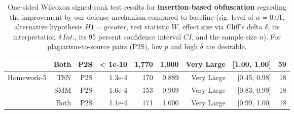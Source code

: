 \begin{table}[h]
\begin{tabular}{lrrrrrrrr}
		                                & Both    & P2S   & < 1e-10 & 1,770 & 1.000    & Very Large     & [1.00, 1.00]     & 59 \\  
		\hline
		\multirow{3}{*}{{Homework-5}}   & TSN     & P2S   & 1.3e-4  & 170   & 0.889    & Very Large     & [0.45, 0.98]     & 18 \\ 
		                                & SMM     & P2S   & 1.6e-4  & 153   & 0.969    & Very Large     & [0.83, 0.99]     & 18 \\ 
		                                & Both    & P2S   & 1.1e-4  & 171   & 1.000    & Very Large     & [0.99, 1.00]     & 18 \\ 
		\bottomrule
	\end{tabular}
	\caption[Statistical Tests: Insertion-based Obfuscation]{One-sided Wilcoxon signed-rank test results for \textbf{insertion-based obfuscation} regarding the improvement by our defense mechanism compared to baseline (sig. level of $\alpha=0.01$, alternative hypothesis $H1=greater$, test statistic $W$, effect size via Cliff's delta $\delta$, its interpretation $\delta\,Int.$, its 95 percent confidence interval $CI$, and the sample size $n$). For plagiarism-to-source pairs (P2S), low $p$ and high $\delta$ are desirable.} 
	\label{tab:to-base-insert}
\end{table}
